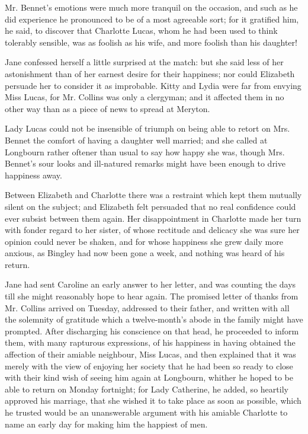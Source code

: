 \documentclass[12pt]{book}
\begin{document}
Mr. Bennet's emotions were much more tranquil on the occasion, and such as he did experience he pronounced to be of a most agreeable sort; for it gratified him, he said, to discover that Charlotte Lucas, whom he had been used to think tolerably sensible, was as foolish as his wife, and more foolish than his daughter!

Jane confessed herself a little surprised at the match: but she said less of her astonishment than of her earnest desire for their happiness; nor could Elizabeth persuade her to consider it as improbable. Kitty and Lydia were far from envying Miss Lucas, for Mr. Collins was only a clergyman; and it affected them in no other way than as a piece of news to spread at Meryton.

Lady Lucas could not be insensible of triumph on being able to retort on Mrs. Bennet the comfort of having a daughter well married; and she called at Longbourn rather oftener than usual to say how happy she was, though Mrs. Bennet's sour looks and ill-natured remarks might have been enough to drive happiness away.

Between Elizabeth and Charlotte there was a restraint which kept them mutually silent on the subject; and Elizabeth felt persuaded that no real confidence could ever subsist between them again. Her disappointment in Charlotte made her turn with fonder regard to her sister, of whose rectitude and delicacy she was sure her opinion could never be shaken, and for whose happiness she grew daily more anxious, as Bingley had now been gone a week, and nothing was heard of his return.

Jane had sent Caroline an early answer to her letter, and was counting the days till she might reasonably hope to hear again. The promised letter of thanks from Mr. Collins arrived on Tuesday, addressed to their father, and written with all the solemnity of gratitude which a twelve-month's abode in the family might have prompted. After discharging his conscience on that head, he proceeded to inform them, with many rapturous expressions, of his happiness in having obtained the affection of their amiable neighbour, Miss Lucas, and then explained that it was merely with the view of enjoying her society that he had been so ready to close with their kind wish of seeing him again at Longbourn, whither he hoped to be able to return on Monday fortnight; for Lady Catherine, he added, so heartily approved his marriage, that she wished it to take place as soon as possible, which he trusted would be an unanswerable argument with his amiable Charlotte to name an early day for making him the happiest of men.
\end{document}
